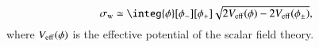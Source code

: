     \begin{equation}\label{eq:pertwalls:thinwall:surface_tension}
        \sigma\ped{w} \simeq \integ{\phi}[\phi_-][\phi_+] \sqrt{ 2V\ped{eff}(\phi)-2V\ped{eff}(\phi_\pm) },
    \end{equation}
    where $V_\mathrm{eff}(\phi)$ is the effective potential of the scalar field theory. 



















